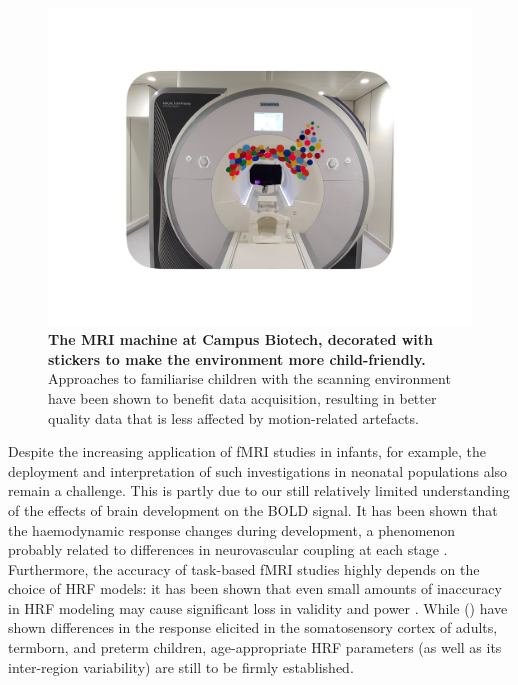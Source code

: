 \begin{figure}[h!]
\centering\includegraphics[width=1\linewidth]{images/Ch2/Ch2_MRI.pdf}
\caption{\textbf{The MRI machine at Campus Biotech, decorated with stickers to make the environment more child-friendly.} Approaches to familiarise children with the scanning environment have been shown to benefit data acquisition, resulting in better quality data that is less affected by motion-related artefacts.} \label{fig:MRI}
\end{figure}




Despite the increasing application of fMRI studies in infants, for example, the deployment and interpretation of such investigations in neonatal populations also remain a challenge. 
This is partly due to our still relatively limited understanding of the effects of brain development on the BOLD signal. 
It has been shown that the haemodynamic response changes during development, a phenomenon probably related to differences in neurovascular coupling at each stage \citep{Arichi2012}. 
Furthermore, the accuracy of task-based fMRI studies highly depends on the choice of HRF models: it has been shown that even small amounts of inaccuracy in HRF modeling may cause significant loss in validity and power \citep{Lindquist2007, Loh2008}. 
While \citeauthor{Arichi2012} (\citeyear{Arichi2012}) have shown differences in the response elicited in the somatosensory cortex of adults, termborn, and preterm children, age-appropriate HRF parameters (as well as its inter-region variability) are still to be firmly established.


